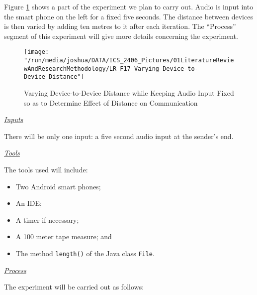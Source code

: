 \documentclass[12pt,svgnames,smaller]{article} %
\begin{document}
\begin{enumerate}
\begin{enumerate}
			Figure \ref{fig:LiteratureReview-Figure17} shows a part of the experiment we plan to carry out. Audio is input into the smart phone on the left for a fixed five seconds. The distance between devices is then varied by adding ten metres to it after each iteration. The “Process” segment of this experiment will give more details concerning the experiment.
			
			\begin{figure}
				\centering
				\texttt{[image: "/run/media/joshua/DATA/ICS\_2406\_Pictures/01LiteratureReviewAndResearchMethodology/LR\_F17\_Varying\_Device-to-Device\_Distance"]}
				\caption{Varying Device-to-Device Distance while Keeping Audio Input Fixed so as to Determine Effect of Distance on Communication }
				\label{fig:LiteratureReview-Figure17}
			\end{figure}
			
			\textsf{\underline{\emph{Inputs}}}
			
			There will be only one input: a five second audio input at the sender’s end.
			
			\emph{\underline{\textsf{Tools}}}
			
			The tools used will include:
			
			\begin{itemize}
				\item Two Android smart phones;
				\item An IDE;
				\item A timer if necessary;
				\item A 100 meter tape measure; and
				\item The method \texttt{length()} of the Java class \texttt{File}.
			\end{itemize}
			
			\emph{\underline{\textsf{Process}}}
			
			The experiment will be carried out as follows:
			

\end{enumerate}
\end{enumerate}
\end{document}
